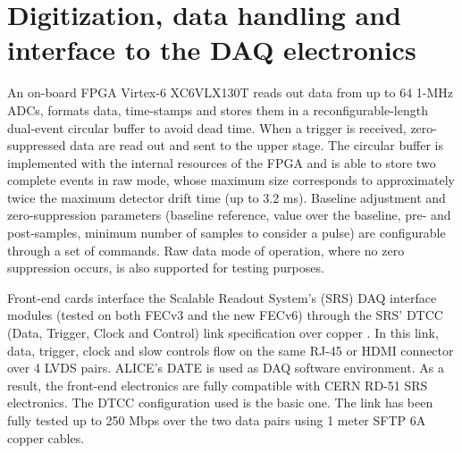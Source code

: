\section{Digitization, data handling and interface to the DAQ electronics}
An on-board FPGA Virtex-6 XC6VLX130T reads out data from up to 64 1-MHz ADCs, formats data, time-stamps and stores them in a reconfigurable-length dual-event circular buffer to avoid dead time. When a trigger is received, zero-suppressed data are read out and sent to the upper stage.
The circular buffer is implemented with the internal resources of the FPGA and is able to store two complete events in raw mode, whose maximum size corresponds to approximately twice the maximum detector drift time (up to 3.2 ms).
Baseline adjustment and zero-suppression parameters (baseline reference, value over the baseline, pre- and post-samples, minimum number of samples to consider a pulse) are configurable through a set of commands. 
Raw data mode of operation, where no zero suppression occurs, is also supported for testing purposes.

Front-end cards interface the Scalable Readout System's (SRS) DAQ interface modules \cite{bib6} (tested on both FECv3 and the new FECv6) through the SRS' DTCC (Data, Trigger, Clock and Control) link specification over copper \cite{bib7}. In this link, data, trigger, clock and slow controls flow on the same RJ-45 or HDMI connector over 4 LVDS pairs. ALICE's DATE is used as DAQ software environment. As a result, the front-end electronics are fully compatible with CERN RD-51 SRS electronics.
The DTCC configuration used is the basic one.
The link has been fully tested up to 250 Mbps over the two data pairs using 1 meter SFTP 6A copper cables.

